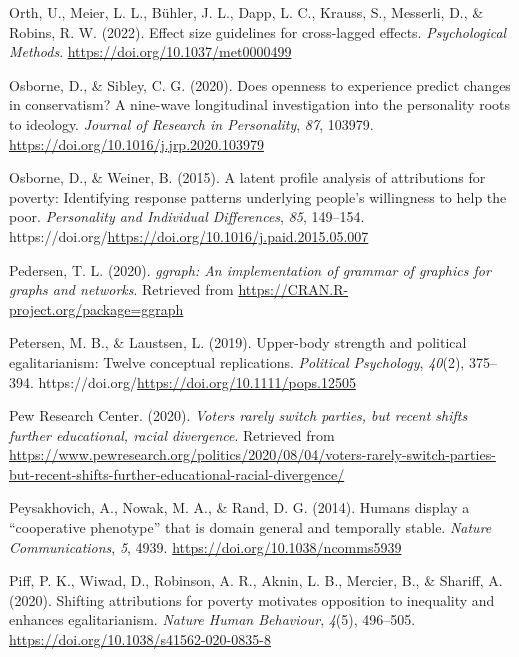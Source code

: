 \documentclass[
  man,floatsintext]{apa6}
\newlength{\cslhangindent}
\newlength{\cslentryspacingunit} %
\newenvironment{CSLReferences}[2] %
 {%
  \setlength{\parindent}{0pt}
  \ifodd #1
  \let\oldpar\par
  \def\par{\hangindent=\cslhangindent\oldpar}
  \fi
  \setlength{\parskip}{#2\cslentryspacingunit}
 }%
 {}
\begin{document}
\begin{CSLReferences}{1}{0}
\leavevmode{}%
Orth, U., Meier, L. L., Bühler, J. L., Dapp, L. C., Krauss, S., Messerli, D., \& Robins, R. W. (2022). Effect size guidelines for cross-lagged effects. \emph{Psychological Methods}. \url{https://doi.org/10.1037/met0000499}

\leavevmode{}%
Osborne, D., \& Sibley, C. G. (2020). Does openness to experience predict changes in conservatism? A nine-wave longitudinal investigation into the personality roots to ideology. \emph{Journal of Research in Personality}, \emph{87}, 103979. \url{https://doi.org/10.1016/j.jrp.2020.103979}

\leavevmode{}%
Osborne, D., \& Weiner, B. (2015). A latent profile analysis of attributions for poverty: Identifying response patterns underlying people's willingness to help the poor. \emph{Personality and Individual Differences}, \emph{85}, 149--154. https://doi.org/\url{https://doi.org/10.1016/j.paid.2015.05.007}

\leavevmode{}%
Pedersen, T. L. (2020). \emph{{ggraph}: An implementation of grammar of graphics for graphs and networks}. Retrieved from \url{https://CRAN.R-project.org/package=ggraph}

\leavevmode{}%
Petersen, M. B., \& Laustsen, L. (2019). Upper-body strength and political egalitarianism: Twelve conceptual replications. \emph{Political Psychology}, \emph{40}(2), 375--394. https://doi.org/\url{https://doi.org/10.1111/pops.12505}

\leavevmode{}%
Pew Research Center. (2020). \emph{Voters rarely switch parties, but recent shifts further educational, racial divergence}. Retrieved from \url{https://www.pewresearch.org/politics/2020/08/04/voters-rarely-switch-parties-but-recent-shifts-further-educational-racial-divergence/}

\leavevmode{}%
Peysakhovich, A., Nowak, M. A., \& Rand, D. G. (2014). Humans display a {``cooperative phenotype''} that is domain general and temporally stable. \emph{Nature Communications}, \emph{5}, 4939. \url{https://doi.org/10.1038/ncomms5939}

\leavevmode{}%
Piff, P. K., Wiwad, D., Robinson, A. R., Aknin, L. B., Mercier, B., \& Shariff, A. (2020). Shifting attributions for poverty motivates opposition to inequality and enhances egalitarianism. \emph{Nature Human Behaviour}, \emph{4}(5), 496--505. \url{https://doi.org/10.1038/s41562-020-0835-8}


\end{CSLReferences}
\end{document}
